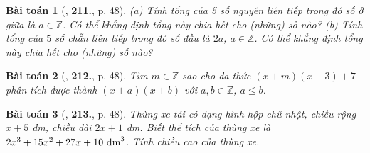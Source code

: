 \documentclass{article}
\numberwithin{equation}{section}
\newtheorem{baitoan}{Bài toán}
\begin{document}
\begin{baitoan}[\cite{Tuyen_Toan_7}, \textbf{211.}, p. 48]
	(a) Tính tổng của 5 số nguyên liên tiếp trong đó số ở giữa là $a\in\mathbb{Z}$. Có thể khẳng định tổng này chia hết cho (những) số nào? (b) Tính tổng của $5$ số chẵn liên tiếp trong đó số đầu là $2a$, $a\in\mathbb{Z}$. Có thể khẳng định tổng này chia hết cho (những) số nào?
\end{baitoan}

\begin{baitoan}[\cite{Tuyen_Toan_7}, \textbf{212.}, p. 48]
	Tìm $m\in\mathbb{Z}$ sao cho đa thức $(x + m)(x - 3) + 7$ phân tích được thành $(x + a)(x + b)$ với $a,b\in\mathbb{Z}$, $a\le b$.
\end{baitoan}

\begin{baitoan}[\cite{Tuyen_Toan_7}, \textbf{213.}, p. 48]
	Thùng xe tải có dạng hình hộp chữ nhật, chiều rộng $x + 5$ \emph{dm}, chiều dài $2x + 1$ \emph{dm}. Biết thể tích của thùng xe là $2x^3 + 15x^2 + 27x + 10\ {\rm dm}^3$. Tính chiều cao của thùng xe.
\end{baitoan}


\printbibliography[heading=bibintoc]
	
\end{document}
